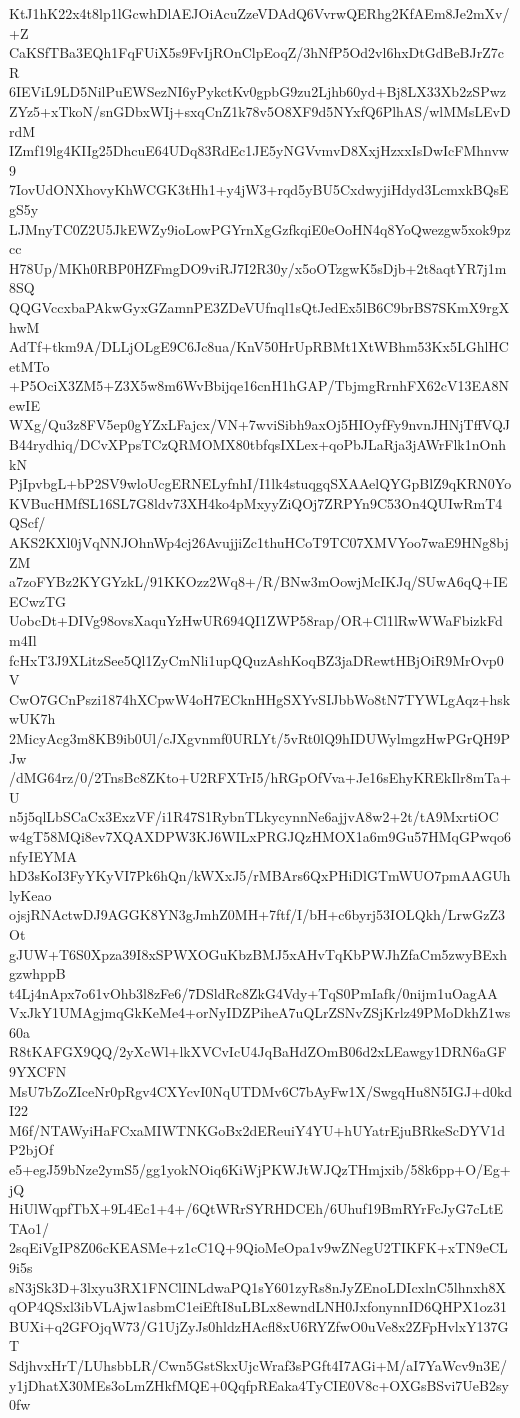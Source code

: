 KtJ1hK22x4t8lp1lGcwhDlAEJOiAcuZzeVDAdQ6VvrwQERhg2KfAEm8Je2mXv/+Z
CaKSfTBa3EQh1FqFUiX5s9FvIjROnClpEoqZ/3hNfP5Od2vl6hxDtGdBeBJrZ7cR
6IEViL9LD5NilPuEWSezNI6yPykctKv0gpbG9zu2Ljhb60yd+Bj8LX33Xb2zSPwz
ZYz5+xTkoN/snGDbxWIj+sxqCnZ1k78v5O8XF9d5NYxfQ6PlhAS/wlMMsLEvDrdM
IZmf19lg4KIIg25DhcuE64UDq83RdEc1JE5yNGVvmvD8XxjHzxxIsDwIcFMhnvw9
7IovUdONXhovyKhWCGK3tHh1+y4jW3+rqd5yBU5CxdwyjiHdyd3LcmxkBQsEgS5y
LJMnyTC0Z2U5JkEWZy9ioLowPGYrnXgGzfkqiE0eOoHN4q8YoQwezgw5xok9pzcc
H78Up/MKh0RBP0HZFmgDO9viRJ7I2R30y/x5oOTzgwK5sDjb+2t8aqtYR7j1m8SQ
QQGVccxbaPAkwGyxGZamnPE3ZDeVUfnql1sQtJedEx5lB6C9brBS7SKmX9rgXhwM
AdTf+tkm9A/DLLjOLgE9C6Jc8ua/KnV50HrUpRBMt1XtWBhm53Kx5LGhlHCetMTo
+P5OciX3ZM5+Z3X5w8m6WvBbijqe16cnH1hGAP/TbjmgRrnhFX62cV13EA8NewIE
WXg/Qu3z8FV5ep0gYZxLFajcx/VN+7wviSibh9axOj5HIOyfFy9nvnJHNjTffVQJ
B44rydhiq/DCvXPpsTCzQRMOMX80tbfqsIXLex+qoPbJLaRja3jAWrFlk1nOnhkN
PjIpvbgL+bP2SV9wloUcgERNELyfnhI/I1lk4stuqgqSXAAelQYGpBlZ9qKRN0Yo
KVBucHMfSL16SL7G8ldv73XH4ko4pMxyyZiQOj7ZRPYn9C53On4QUIwRmT4QScf/
AKS2KXl0jVqNNJOhnWp4cj26AvujjiZc1thuHCoT9TC07XMVYoo7waE9HNg8bjZM
a7zoFYBz2KYGYzkL/91KKOzz2Wq8+/R/BNw3mOowjMcIKJq/SUwA6qQ+IEECwzTG
UobcDt+DIVg98ovsXaquYzHwUR694QI1ZWP58rap/OR+Cl1lRwWWaFbizkFdm4Il
fcHxT3J9XLitzSee5Ql1ZyCmNli1upQQuzAshKoqBZ3jaDRewtHBjOiR9MrOvp0V
CwO7GCnPszi1874hXCpwW4oH7ECknHHgSXYvSIJbbWo8tN7TYWLgAqz+hskwUK7h
2MicyAcg3m8KB9ib0Ul/cJXgvnmf0URLYt/5vRt0lQ9hIDUWylmgzHwPGrQH9PJw
/dMG64rz/0/2TnsBc8ZKto+U2RFXTrI5/hRGpOfVva+Je16sEhyKREkIlr8mTa+U
n5j5qlLbSCaCx3ExzVF/i1R47S1RybnTLkycynnNe6ajjvA8w2+2t/tA9MxrtiOC
w4gT58MQi8ev7XQAXDPW3KJ6WILxPRGJQzHMOX1a6m9Gu57HMqGPwqo6nfyIEYMA
hD3sKoI3FyYKyVI7Pk6hQn/kWXxJ5/rMBArs6QxPHiDlGTmWUO7pmAAGUhlyKeao
ojsjRNActwDJ9AGGK8YN3gJmhZ0MH+7ftf/I/bH+c6byrj53IOLQkh/LrwGzZ3Ot
gJUW+T6S0Xpza39I8xSPWXOGuKbzBMJ5xAHvTqKbPWJhZfaCm5zwyBExhgzwhppB
t4Lj4nApx7o61vOhb3l8zFe6/7DSldRc8ZkG4Vdy+TqS0PmIafk/0nijm1uOagAA
VxJkY1UMAgjmqGkKeMe4+orNyIDZPiheA7uQLrZSNvZSjKrlz49PMoDkhZ1ws60a
R8tKAFGX9QQ/2yXcWl+lkXVCvIcU4JqBaHdZOmB06d2xLEawgy1DRN6aGF9YXCFN
MsU7bZoZIceNr0pRgv4CXYcvI0NqUTDMv6C7bAyFw1X/SwgqHu8N5IGJ+d0kdI22
M6f/NTAWyiHaFCxaMIWTNKGoBx2dEReuiY4YU+hUYatrEjuBRkeScDYV1dP2bjOf
e5+egJ59bNze2ymS5/gg1yokNOiq6KiWjPKWJtWJQzTHmjxib/58k6pp+O/Eg+jQ
HiUlWqpfTbX+9L4Ec1+4+/6QtWRrSYRHDCEh/6Uhuf19BmRYrFcJyG7cLtETAo1/
2sqEiVgIP8Z06cKEASMe+z1cC1Q+9QioMeOpa1v9wZNegU2TIKFK+xTN9eCL9i5s
sN3jSk3D+3lxyu3RX1FNClINLdwaPQ1sY601zyRs8nJyZEnoLDIcxlnC5lhnxh8X
qOP4QSxl3ibVLAjw1asbmC1eiEftI8uLBLx8ewndLNH0JxfonynnID6QHPX1oz31
BUXi+q2GFOjqW73/G1UjZyJs0hldzHAcfl8xU6RYZfwO0uVe8x2ZFpHvlxY137GT
SdjhvxHrT/LUhsbbLR/Cwn5GstSkxUjcWraf3sPGft4I7AGi+M/aI7YaWcv9n3E/
y1jDhatX30MEs3oLmZHkfMQE+0QqfpREaka4TyCIE0V8c+OXGsBSvi7UeB2sy0fw

